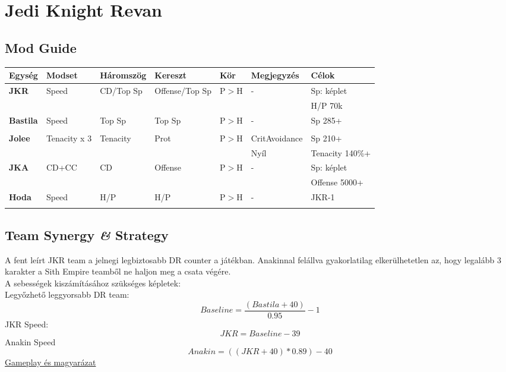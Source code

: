 \documentclass[11pt]{report}
\begin{document}

\chapter{Jedi Knight Revan}
\section{Mod Guide}
\begin{center}
    \begin{tabular}{|l | l | l | l | l | l | l |}
        \hline
        Egység & Modset & Háromszög & Kereszt & Kör & Megjegyzés & Célok\\ \hline
        \textbf{JKR} & Speed & CD/Top Sp & Offense/Top Sp & P$>$H & - & Sp: képlet\\ 
        &  &  &  &  &  & H/P 70k\\ \hline
        \textbf{Bastila} & Speed & Top Sp & Top Sp & P$>$H & - & Sp 285+\\
        &  &  &  &  &  & \\ \hline        
        \textbf{Jolee} & Tenacity x 3 & Tenacity & Prot & P$>$H & CritAvoidance & Sp 210+\\
        &  &  &  &  & Nyíl & Tenacity 140\%+\\ \hline
        \textbf{JKA} & CD+CC & CD & Offense & P$>$H & - & Sp: képlet\\
        &  &  &  &  &  & Offense 5000+\\ \hline
        \textbf{Hoda} & Speed & H/P & H/P & P$>$H & - & JKR-1\\
        &  &  &  &  &  &  \\ \hline
    \end{tabular}
\end{center}
\section{Team Synergy \textit{\&} Strategy}
A fent leírt JKR team a jelnegi legbiztosabb DR counter a játékban. Anakinnal felállva gyakorlatilag elkerülhetetlen az, hogy legalább 3 karakter a Sith Empire teamből ne haljon meg a csata végére.\\
A sebességek kiszámításához szükséges képletek:\\
Legyőzhető leggyorsabb DR team:
\begin{equation}
    Baseline=\frac{(Bastila+40)}{0.95}-1
\end{equation}
JKR Speed:
\begin{equation}
    JKR=Baseline-39
\end{equation}
Anakin Speed
\begin{equation}
    Anakin=((JKR+40)*0.89)-40
\end{equation}
\href{https://youtu.be/IH_Xo9CuSho}{Gameplay és magyarázat}
\end{document}
